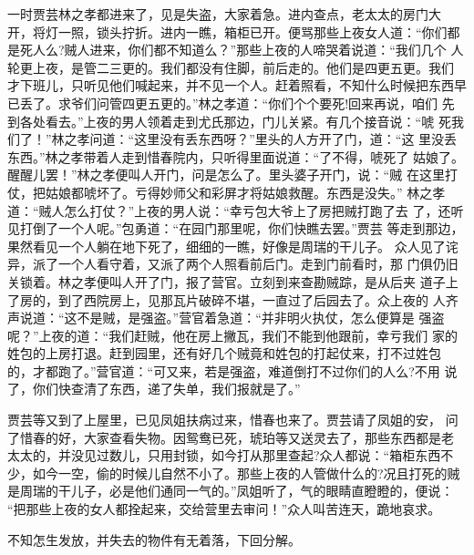 一时贾芸林之孝都进来了，见是失盗，大家着急。进内查点，老太太的房门大
开，将灯一照，锁头拧折。进内一瞧，箱柜已开。便骂那些上夜女人道：“你们都
是死人么?贼人进来，你们都不知道么？”那些上夜的人啼哭着说道：“我们几个
人轮更上夜，是管二三更的。我们都没有住脚，前后走的。他们是四更五更。我们
才下班儿，只听见他们喊起来，并不见一个人。赶着照看，不知什么时候把东西早
已丢了。求爷们问管四更五更的。”林之孝道：“你们个个要死!回来再说，咱们
先到各处看去。”上夜的男人领着走到尤氏那边，门儿关紧。有几个接音说：“唬
死我们了！”林之孝问道：“这里没有丢东西呀？”里头的人方开了门，道：“这
里没丢东西。”林之孝带着人走到惜春院内，只听得里面说道：“了不得，唬死了
姑娘了。醒醒儿罢！”林之孝便叫人开门，问是怎么了。里头婆子开门，说：“贼
在这里打仗，把姑娘都唬坏了。亏得妙师父和彩屏才将姑娘救醒。东西是没失。”
林之孝道：“贼人怎么打仗？”上夜的男人说：“幸亏包大爷上了房把贼打跑了去
了，还听见打倒了一个人呢。”包勇道：“在园门那里呢，你们快瞧去罢。”贾芸
等走到那边，果然看见一个人躺在地下死了，细细的一瞧，好像是周瑞的干儿子。
众人见了诧异，派了一个人看守着，又派了两个人照看前后门。走到门前看时，那
门俱仍旧关锁着。林之孝便叫人开了门，报了营官。立刻到来查勘贼踪，是从后夹
道子上了房的，到了西院房上，见那瓦片破碎不堪，一直过了后园去了。众上夜的
人齐声说道：“这不是贼，是强盗。”营官着急道：“并非明火执仗，怎么便算是
强盗呢？”上夜的道：“我们赶贼，他在房上撇瓦，我们不能到他跟前，幸亏我们
家的姓包的上房打退。赶到园里，还有好几个贼竟和姓包的打起仗来，打不过姓包
的，才都跑了。”营官道：“可又来，若是强盗，难道倒打不过你们的人么?不用
说了，你们快查清了东西，递了失单，我们报就是了。”

贾芸等又到了上屋里，已见凤姐扶病过来，惜春也来了。贾芸请了凤姐的安，
问了惜春的好，大家查看失物。因鸳鸯已死，琥珀等又送灵去了，那些东西都是老
太太的，并没见过数儿，只用封锁，如今打从那里查起?众人都说：“箱柜东西不
少，如今一空，偷的时候儿自然不小了。那些上夜的人管做什么的?况且打死的贼
是周瑞的干儿子，必是他们通同一气的。”凤姐听了，气的眼睛直瞪瞪的，便说：
“把那些上夜的女人都拴起来，交给营里去审问！”众人叫苦连天，跪地哀求。

不知怎生发放，并失去的物件有无着落，下回分解。